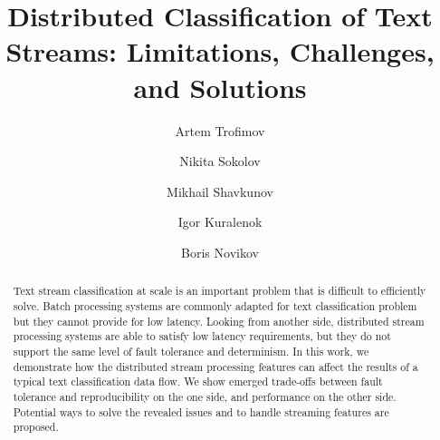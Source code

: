\documentclass[sigconf]{acmart}
\theoremstyle{remark}
\begin{document}

\title {Distributed Classification of Text Streams: Limitations, Challenges, and Solutions}


\author{Artem Trofimov}

\author{Nikita Sokolov}

\author{Mikhail Shavkunov}

\author{Igor Kuralenok}

\author{Boris Novikov}

\begin{abstract}

Text stream classification at scale is an important problem that is difficult to efficiently solve. Batch processing systems are commonly adapted for text classification problem but they cannot provide for low latency. Looking from another side, distributed stream processing systems are able to satisfy low latency requirements, but they do not support the same level of fault tolerance and determinism. In this work, we demonstrate how the distributed stream processing features can affect the results of a typical text classification data flow. We show emerged trade-offs between fault tolerance and reproducibility on the one side, and performance on the other side. Potential ways to solve the revealed issues and to handle streaming features are proposed.

\end{abstract}
\end{document}
